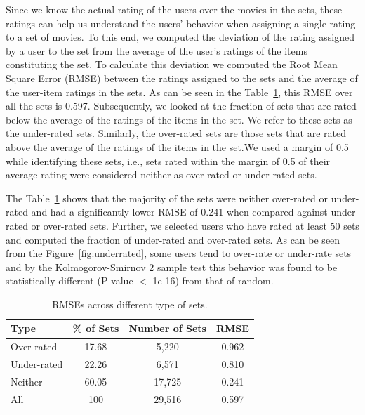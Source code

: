 Since we know the actual rating of the users over the movies in the sets,
these ratings can help us understand the users' behavior when assigning a single
rating to a set of movies. To this end, we computed the deviation of the 
rating assigned by a user to the set
from the average of the user's  ratings of the items constituting the set. To
calculate this deviation we computed the Root Mean Square Error (RMSE) between
the ratings assigned to the sets and the average of the user-item ratings in
the sets. As can be seen in the Table~\ref{table:sets_rmse_table}, this RMSE
over all the sets is 0.597. Subsequently, we looked at the fraction of sets that are
rated below the average of the ratings of the items in the set. We refer to
these sets as the under-rated sets. Similarly, the over-rated sets are
those sets that are rated above the average of the ratings of the items in the
set.We used a margin of 0.5 while identifying these sets, i.e., sets rated
within the margin of 0.5 of their average rating were considered neither as
over-rated or under-rated sets.

The Table~\ref{table:sets_rmse_table} shows that the majority of the sets were neither over-rated or
under-rated and had a significantly lower RMSE of 0.241 when compared against
under-rated or over-rated sets. Further, we selected users who have rated at
least 50 sets and computed the fraction of under-rated and over-rated sets.
As can be seen from the Figure~\ref{fig:underrated}, some users tend to over-rate or under-rate sets
and by the Kolmogorov-Smirnov 2 sample test this behavior was found to be
statistically different (P-value $<$ 1e-16) from that of random.

\begin{table}[t]
  \centering
  \caption{RMSEs across different type of sets.}
  \label{table:sets_rmse_table}
  \begin{tabular}{|l|c|c|c|}
    \hline
    Type
    &\multicolumn{1}{|p{2cm}|}{\centering \% of Sets}
    &\multicolumn{1}{|p{2cm}|}{\centering Number of Sets}
    &\multicolumn{1}{|p{1cm}|}{\centering RMSE} \\
    \hline
    Over-rated  & 17.68 & 5,220  & 0.962 \\
    Under-rated & 22.26 & 6,571  & 0.810 \\
        Neither & 60.05 & 17,725  & 0.241 \\
    \hline
    All & 100   & 29,516 & 0.597 \\
    \hline
  \end{tabular}
\end{table}


